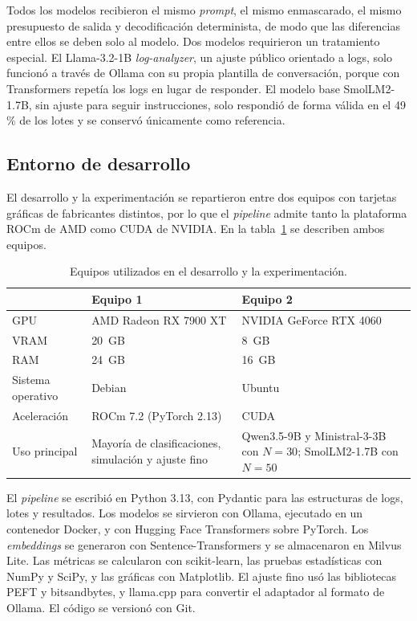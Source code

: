 Todos los modelos recibieron el mismo \textit{prompt}, el mismo enmascarado, el mismo presupuesto de salida y decodificación determinista, de modo que las diferencias entre ellos se deben solo al modelo. Dos modelos requirieron un tratamiento especial. El Llama-3.2-1B \textit{log-analyzer}, un ajuste público orientado a logs, solo funcionó a través de Ollama con su propia plantilla de conversación, porque con Transformers repetía los logs en lugar de responder. El modelo base SmolLM2-1.7B, sin ajuste para seguir instrucciones, solo respondió de forma válida en el 49\,\% de los lotes y se conservó únicamente como referencia.

\subsection{Entorno de desarrollo}\label{subsec:met_entorno}

El desarrollo y la experimentación se repartieron entre dos equipos con tarjetas gráficas de fabricantes distintos, por lo que el \textit{pipeline} admite tanto la plataforma ROCm de AMD como CUDA de NVIDIA. En la tabla~\ref{tab:met_equipos} se describen ambos equipos.

\begin{table}[H]
\centering
\caption{Equipos utilizados en el desarrollo y la experimentación.}
\label{tab:met_equipos}
\small
\begin{tabular}{@{}p{3cm}p{5.4cm}p{5.4cm}@{}}
\toprule
 & \textbf{Equipo 1} & \textbf{Equipo 2} \\
\midrule
GPU & AMD Radeon RX 7900 XT & NVIDIA GeForce RTX 4060 \\
VRAM & 20~GB & 8~GB \\
RAM & 24~GB & 16~GB \\
Sistema operativo & Debian & Ubuntu \\
Aceleración & ROCm 7.2 (PyTorch 2.13) & CUDA \\
Uso principal & Mayoría de clasificaciones, simulación y ajuste fino & Qwen3.5-9B y Ministral-3-3B con $N=30$; SmolLM2-1.7B con $N=50$ \\
\bottomrule
\end{tabular}
\normalsize
\end{table}

El \textit{pipeline} se escribió en Python 3.13, con Pydantic para las estructuras de logs, lotes y resultados. Los modelos se sirvieron con Ollama, ejecutado en un contenedor Docker, y con Hugging Face Transformers sobre PyTorch. Los \textit{embeddings} se generaron con Sentence-Transformers y se almacenaron en Milvus Lite. Las métricas se calcularon con scikit-learn, las pruebas estadísticas con NumPy y SciPy, y las gráficas con Matplotlib. El ajuste fino usó las bibliotecas PEFT y bitsandbytes, y llama.cpp para convertir el adaptador al formato de Ollama. El código se versionó con Git.

